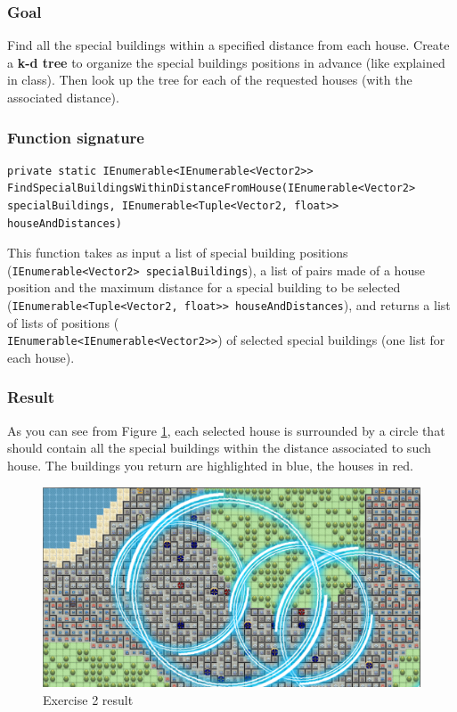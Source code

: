 \subsubsection*{Goal}
Find all the special buildings within a specified distance from each house. Create a \textbf{k-d tree} to organize the special buildings positions in advance (like explained in class). Then look up the tree for each of the requested houses (with the associated distance).

\subsubsection*{Function signature} 
\begin{lstlisting}
private static IEnumerable<IEnumerable<Vector2>> FindSpecialBuildingsWithinDistanceFromHouse(IEnumerable<Vector2> specialBuildings, IEnumerable<Tuple<Vector2, float>> houseAndDistances)
\end{lstlisting}

\noindent
This function takes as input a list of special building positions (\texttt{IEnumerable<Vector2> specialBuildings}), a list of pairs made of a house position and the maximum distance for a special building to be selected (\texttt{IEnumerable<Tuple<Vector2, float>> houseAndDistances}), and returns a list of lists of positions (\\ \texttt{IEnumerable<IEnumerable<Vector2>>}) of selected special buildings (one list for each house).\\

\subsubsection*{Result}
As you can see from Figure \ref{img:Ex2}, each selected house is surrounded by a circle that should contain all the special buildings within the distance associated to such house. The buildings you return are highlighted in blue, the houses in red.

\begin{figure}[!h]
\centering
\includegraphics[scale=0.25]{img/exercise2}
\caption{Exercise 2 result}
\label{img:Ex2}
\end{figure}

